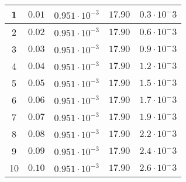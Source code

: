 \begin{enumerate}
\begin{center}
\begin{tabular}{|c|c|c|c|c|}
					1 & 
					$0.01$ & 
					$0.951 \cdot 10^{-3}$ & 
					$17.90$ & 
					$0.3 \cdot 10^-3$ 
					\\\hline
				
					2 & 
					$0.02$ & 
					$0.951 \cdot 10^{-3}$ & 
					$17.90$ & 
					$0.6 \cdot 10^-3$ 
					\\\hline
				
					3 & 
					$0.03$ & 
					$0.951 \cdot 10^{-3}$ & 
					$17.90$ & 
					$0.9 \cdot 10^-3$ 
					\\\hline
				
					4 & 
					$0.04$ & 
					$0.951 \cdot 10^{-3}$ & 
					$17.90$ & 
					$1.2 \cdot 10^-3$ 
					\\\hline
				
					5 & 
					$0.05$ & 
					$0.951 \cdot 10^{-3}$ & 
					$17.90$ & 
					$1.5 \cdot 10^-3$ 
					\\\hline
				
					6 & 
					$0.06$ & 
					$0.951 \cdot 10^{-3}$ & 
					$17.90$ & 
					$1.7 \cdot 10^-3$ 
					\\\hline
				
					7 & 
					$0.07$ & 
					$0.951 \cdot 10^{-3}$ & 
					$17.90$ & 
					$1.9 \cdot 10^-3$ 
					\\\hline
				
					8 & 
					$0.08$ & 
					$0.951 \cdot 10^{-3}$ & 
					$17.90$ & 
					$2.2 \cdot 10^-3$ 
					\\\hline
				
					9 & 
					$0.09$ & 
					$0.951 \cdot 10^{-3}$ & 
					$17.90$ & 
					$2.4 \cdot 10^-3$ 
					\\\hline
				
					10 & 
					$0.10$ & 
					$0.951 \cdot 10^{-3}$ & 
					$17.90$ & 
					$2.6 \cdot 10^-3$ 
					\\\hline
				
			\end{tabular}
		\end{center}

 \end{enumerate}